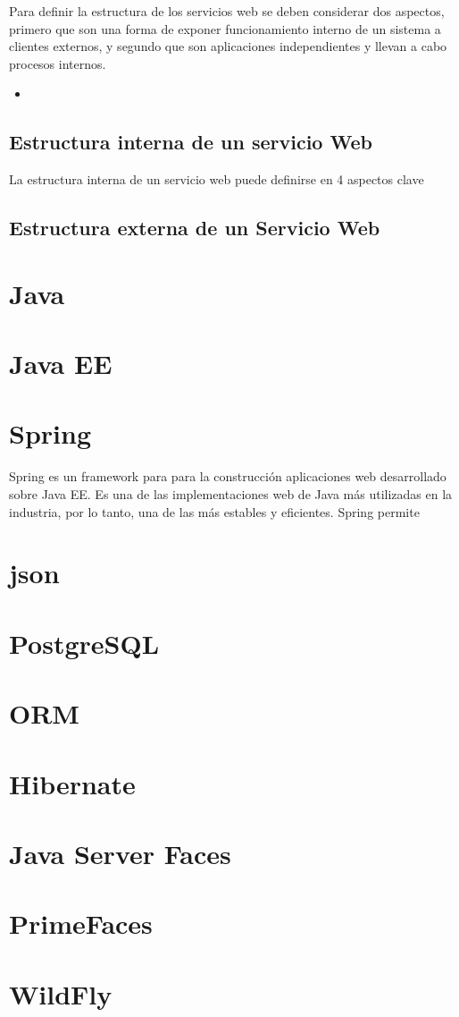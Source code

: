 Para definir la estructura de los servicios web se deben considerar dos aspectos, primero que son una forma de exponer funcionamiento interno de un sistema a clientes externos, y segundo que son aplicaciones independientes y llevan a cabo procesos internos.
\begin{itemize}
\item 
\end{itemize}

\subsection{ Estructura interna de un servicio Web }
La estructura interna de un servicio web puede definirse en 4 aspectos clave 


\subsection{ Estructura externa de un Servicio Web }



\section{ Java }
\section{ Java EE }
\section{ Spring }
Spring es un framework para para la construcción aplicaciones web desarrollado sobre Java EE. Es una de las implementaciones web de Java más utilizadas en la industria, por lo tanto, una de las más estables y eficientes. Spring permite  
\section{json}
\section{PostgreSQL}
\section{ORM}
\section{Hibernate}
\section{Java Server Faces}
\section{PrimeFaces}
\section{WildFly}